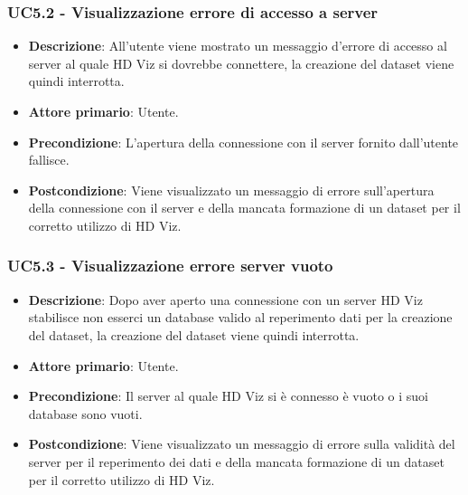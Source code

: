 \subsubsection{UC5.2 - Visualizzazione errore di accesso a server}
\label{ssub:uc5.2}
\begin{itemize}
    \item \textbf{Descrizione}: All'utente viene mostrato un messaggio d'errore di accesso
                                al server al quale HD Viz si dovrebbe connettere, la creazione del dataset viene quindi interrotta.

    \item \textbf{Attore primario}: Utente.
    
    \item \textbf{Precondizione}:   L'apertura della connessione con il server fornito dall'utente fallisce.

    \item \textbf{Postcondizione}:  Viene visualizzato un messaggio di errore sull'apertura della connessione 
                                    con il server e della mancata formazione di un dataset per il corretto utilizzo di HD Viz.

\end{itemize}



\subsubsection{UC5.3 - Visualizzazione errore server vuoto}
\label{ssub:uc5.3}
\begin{itemize}
    \item \textbf{Descrizione}: Dopo aver aperto una connessione con un server HD Viz stabilisce non esserci
                                un database valido al reperimento dati per la creazione del dataset, la creazione
                                del dataset viene quindi interrotta.

    \item \textbf{Attore primario}: Utente.
    
    \item \textbf{Precondizione}:   Il server al quale HD Viz si è connesso è vuoto o i suoi database sono vuoti.

    \item \textbf{Postcondizione}:   Viene visualizzato un messaggio di errore sulla validità del server per il reperimento
                                    dei dati e della mancata formazione di un dataset per il corretto utilizzo di HD Viz.


\end{itemize}


